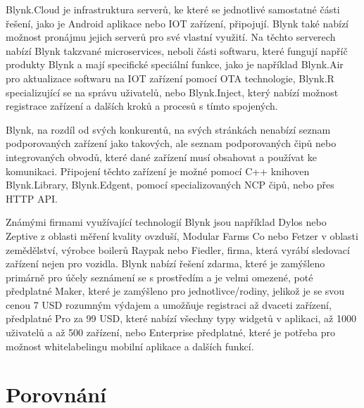 Blynk.Cloud je infrastruktura serverů, ke které se jednotlivé samostatné části řešení, jako je Android aplikace nebo IOT zařízení, připojují. Blynk také nabízí možnost pronájmu jejich serverů pro své vlastní využití. Na těchto serverech nabízí Blynk takzvané microservices, neboli části softwaru, které fungují napříč produkty Blynk a mají specifické speciální funkce, jako je například Blynk.Air pro aktualizace softwaru na IOT zařízení pomocí OTA technologie, Blynk.R specializující se na správu uživatelů, nebo Blynk.Inject, který nabízí možnost registrace zařízení a dalších kroků a procesů s tímto spojených.

Blynk, na rozdíl od svých konkurentů, na svých stránkách nenabízí seznam podporovaných zařízení jako takových, ale seznam podporovaných čipů nebo integrovaných obvodů, které dané zařízení musí obsahovat a používat ke komunikaci. Připojení těchto zařízení je možné pomocí C++ knihoven Blynk.Library, Blynk.Edgent, pomocí specializovaných NCP čipů, nebo přes HTTP API.

Známými firmami využívající technologií Blynk jsou například Dylos nebo Zeptive z oblasti měření kvality ovzduší, Modular Farms Co nebo Fetzer v oblasti zemědělství, výrobce boilerů Raypak nebo Fiedler, firma, která vyrábí sledovací zařízení nejen pro vozidla.
Blynk nabízí řešení zdarma, které je zamýšleno primárně pro účely seznámení se s prostředím a je velmi omezené, poté předplatné Maker, které je zamýšleno pro jednotlivce/rodiny, jelikož je se svou cenou 7 USD rozumným výdajem a umožňuje registraci až dvaceti zařízení, předplatné Pro za 99 USD, které nabízí všechny typy widgetů v aplikaci, až 1000 uživatelů a až 500 zařízení, nebo Enterprise předplatné, které je potřeba pro možnost whitelabelingu mobilní aplikace a dalších funkcí.


\section{Porovnání}
